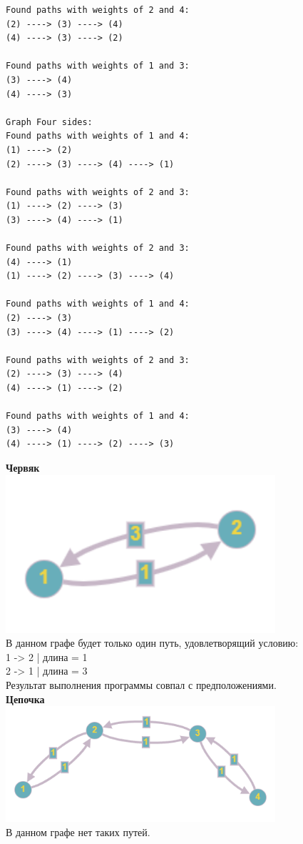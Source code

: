 \documentclass[a4paper,14pt]{extarticle}
\begin{document}
\begin{enumerate}[1.]
\begin{verbatim}
Found paths with weights of 2 and 4:
(2) ----> (3) ----> (4)
(4) ----> (3) ----> (2)

Found paths with weights of 1 and 3:
(3) ----> (4)
(4) ----> (3)

Graph Four sides:
Found paths with weights of 1 and 4:
(1) ----> (2)
(2) ----> (3) ----> (4) ----> (1)  

Found paths with weights of 2 and 3:
(1) ----> (2) ----> (3)
(3) ----> (4) ----> (1)

Found paths with weights of 2 and 3:
(4) ----> (1)
(1) ----> (2) ----> (3) ----> (4)  

Found paths with weights of 1 and 4:
(2) ----> (3)
(3) ----> (4) ----> (1) ----> (2)  

Found paths with weights of 2 and 3:
(2) ----> (3) ----> (4)
(4) ----> (1) ----> (2)

Found paths with weights of 1 and 4:
(3) ----> (4)
(4) ----> (1) ----> (2) ----> (3)
                    \end{verbatim}
        
        \textbf{Червяк}\\
        \includegraphics[width=100mm]{testWorm}\\
        В данном графе будет только один путь, удовлетворящий условию:\\
        1 -> 2 | длина = 1\\
        2 -> 1 | длина = 3\\

        Результат выполнения программы совпал с предположениями.\\

        \textbf{Цепочка}\\
        \includegraphics[width=100mm]{testChain}\\
        В данном графе нет таких путей.\\


\end{enumerate}
\end{document}
